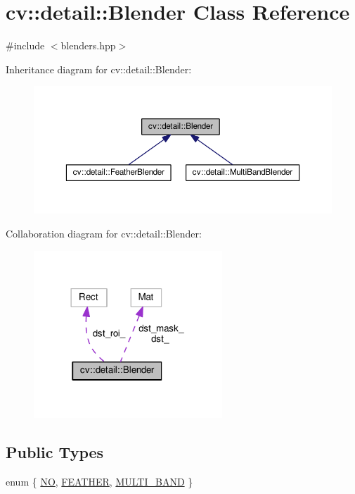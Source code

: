 \hypertarget{classcv_1_1detail_1_1Blender}{\section{cv\-:\-:detail\-:\-:Blender Class Reference}
\label{classcv_1_1detail_1_1Blender}
}


{\ttfamily \#include $<$blenders.\-hpp$>$}



Inheritance diagram for cv\-:\-:detail\-:\-:Blender\-:\nopagebreak
\begin{figure}[H]
\begin{center}
\leavevmode
\includegraphics[width=350pt]{classcv_1_1detail_1_1Blender__inherit__graph}
\end{center}
\end{figure}


Collaboration diagram for cv\-:\-:detail\-:\-:Blender\-:\nopagebreak
\begin{figure}[H]
\begin{center}
\leavevmode
\includegraphics[width=201pt]{classcv_1_1detail_1_1Blender__coll__graph}
\end{center}
\end{figure}
\subsection*{Public Types}
\begin{DoxyCompactItemize}
\item 
enum \{ \hyperlink{classcv_1_1detail_1_1Blender_a862700b452ca7a88d29b365e35e453e9ace01238585a938d70a28fb4c8b3239a5}{N\-O}, 
\hyperlink{classcv_1_1detail_1_1Blender_a862700b452ca7a88d29b365e35e453e9a0ed64191a13e8d7734d33e12fd338574}{F\-E\-A\-T\-H\-E\-R}, 
\hyperlink{classcv_1_1detail_1_1Blender_a862700b452ca7a88d29b365e35e453e9a2561f45ebefa078e121969723c3d2753}{M\-U\-L\-T\-I\-\_\-\-B\-A\-N\-D}
 \}
\end{DoxyCompactItemize}
